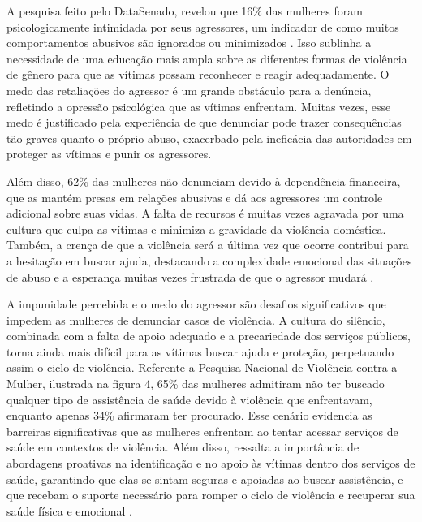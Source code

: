 \documentclass[
    article,			%
    12pt,				%
    oneside,            %
    a4paper,			%
    english,			%
    brazil,				%
    ]{abntex2}
\begin{document}
    A pesquisa feito pelo DataSenado, revelou que 16\% das mulheres foram psicologicamente intimidada por seus agressores, um indicador de como muitos comportamentos abusivos são ignorados ou minimizados  \cite{senadoSP_2023}. Isso sublinha a necessidade de uma educação mais ampla sobre as diferentes formas de violência de gênero para que as vítimas possam reconhecer e reagir adequadamente. O medo das retaliações do agressor é um grande obstáculo para a denúncia, refletindo a opressão psicológica que as vítimas enfrentam. Muitas vezes, esse medo é justificado pela experiência de que denunciar pode trazer consequências tão graves quanto o próprio abuso, exacerbado pela ineficácia das autoridades em proteger as vítimas e punir os agressores.

    Além disso, 62\% das mulheres não denunciam devido à dependência financeira, que as mantém presas em relações abusivas e dá aos agressores um controle adicional sobre suas vidas. A falta de recursos é muitas vezes agravada por uma cultura que culpa as vítimas e minimiza a gravidade da violência doméstica. Também, a crença de que a violência será a última vez que ocorre contribui para a hesitação em buscar ajuda, destacando a complexidade emocional das situações de abuso e a esperança muitas vezes frustrada de que o agressor mudará \cite{senadoSP_2023}.

    A impunidade percebida e o medo do agressor são desafios significativos que impedem as mulheres de denunciar casos de violência. A cultura do silêncio, combinada com a falta de apoio adequado e a precariedade dos serviços públicos, torna ainda mais difícil para as vítimas buscar ajuda e proteção, perpetuando assim o ciclo de violência. Referente a Pesquisa Nacional de Violência contra a Mulher, ilustrada na figura 4, 65\% das mulheres admitiram não ter buscado qualquer tipo de assistência de saúde devido à violência que enfrentavam, enquanto apenas 34\% afirmaram ter procurado. Esse cenário evidencia as barreiras significativas que as mulheres enfrentam ao tentar acessar serviços de saúde em contextos de violência. Além disso, ressalta a importância de abordagens proativas na identificação e no apoio às vítimas dentro dos serviços de saúde, garantindo que elas se sintam seguras e apoiadas ao buscar assistência, e que recebam o suporte necessário para romper o ciclo de violência e recuperar sua saúde física e emocional \cite{saude_2009}.
\end{document}

